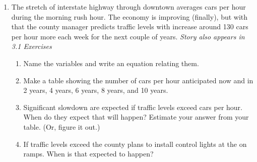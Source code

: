 \begin{enumerate}
\item The stretch of interstate highway through downtown averages  cars per hour during the morning rush hour.  The economy is improving (finally), but with that the county manager predicts traffic levels with increase around 130 cars per hour more each week for the next couple of years. \hfill \emph{Story also appears in 3.1 Exercises}
\begin{enumerate}
\item Name the variables and write an equation relating them.
\item Make a table showing the number of cars per hour anticipated now and in 2 years, 4 years, 6 years, 8 years, and 10 years.
\item Significant slowdown are expected if traffic levels exceed  cars per hour.  When do they expect that will happen? Estimate your answer from your table.  (Or, figure it out.)
\item If traffic levels exceed  the county plans to install control lights at the on ramps.  When is that expected to happen?   
\end{enumerate} 

\end{enumerate}

